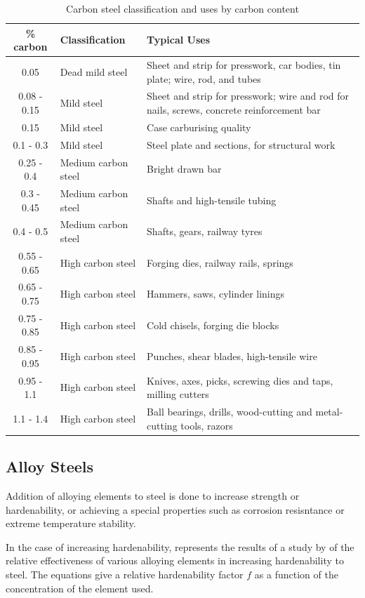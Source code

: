 \documentclass[
10pt,
a4paper,
openany,
svgnames,
]{book}
\begin{document}
\begin{table}[h]
  \centering
  \begin{tabular}{clp{8cm}}
    \toprule
    \% carbon & Classification & Typical Uses \\
    \midrule
    0.05 & Dead mild steel & Sheet and strip for presswork, car bodies, tin plate; wire, rod, and tubes \\
    0.08 - 0.15 & Mild steel & Sheet and strip for presswork; wire and rod for nails, screws, concrete reinforcement bar \\
    0.15 & Mild steel & Case carburising quality \\
    0.1 - 0.3 & Mild steel & Steel plate and sections, for structural work \\
    0.25 - 0.4 & Medium carbon steel & Bright drawn bar \\
    0.3 - 0.45 & Medium carbon steel & Shafts and high-tensile tubing \\
    0.4 - 0.5 & Medium carbon steel & Shafts, gears, railway tyres \\
    0.55 - 0.65 & High carbon steel & Forging dies, railway rails, springs \\
    0.65 - 0.75 & High carbon steel & Hammers, saws, cylinder linings \\
    0.75 - 0.85 & High carbon steel & Cold chisels, forging die blocks \\
    0.85 - 0.95 & High carbon steel & Punches, shear blades, high-tensile wire \\
    0.95 - 1.1 & High carbon steel & Knives, axes, picks, screwing dies and taps, milling cutters \\
    1.1 - 1.4 & High carbon steel & Ball bearings, drills, wood-cutting and metal-cutting tools, razors \\
    \bottomrule
  \end{tabular}
  \caption{Carbon steel classification and uses by carbon content}
  \label{tab: carbon steel classification}
\end{table}

\subsection{Alloy Steels}

Addition of alloying elements to steel is done to increase strength or hardenability, or achieving a special properties such as corrosion resisntance or extreme temperature stability.

In the case of increasing hardenability,  represents the results of a study by \citeauthor{datsko1977materials} of the relative effectiveness of various alloying elements in increasing hardenability to steel. The equations give a relative hardenability factor $f$ as a function of the concentration of the element used. 
\end{document}
